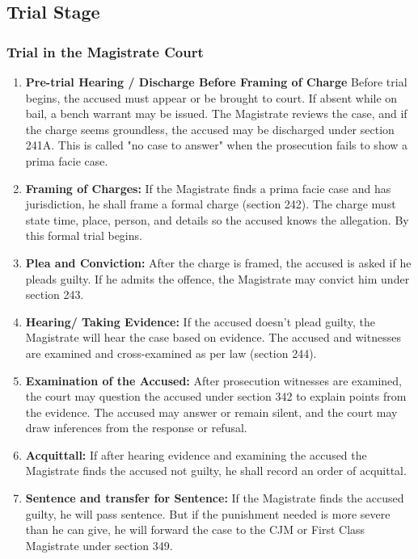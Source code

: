 \subsection{Trial Stage}
\subsubsection{Trial in the Magistrate Court}

\begin{enumerate}[label=$({\roman*})$, itemsep=1em]
   \item \textbf{Pre-trial Hearing / Discharge Before Framing of Charge}
   Before trial begins, the accused must appear or be brought to court. If absent while on bail, a bench warrant may be issued. The Magistrate reviews the case, and if the charge seems groundless, the accused may be discharged under section 241A. This is called "no case to answer" when the prosecution fails to show a prima facie case.
   
   \item \textbf{Framing of Charges:}
   If the Magistrate finds a prima facie case and has jurisdiction, he shall frame a formal charge (section 242). The charge must state time, place, person, and details so the accused knows the allegation. By this formal trial begins.
   
   \item \textbf{Plea and Conviction:}
   After the charge is framed, the accused is asked if he pleads guilty. If he admits the offence, the Magistrate may convict him under section 243.
   
   \item \textbf{Hearing/ Taking Evidence:}
   If the accused doesn't plead guilty, the Magistrate will hear the case based on evidence. The accused and witnesses are examined and cross-examined as per law (section 244).
   
   \item \textbf{Examination of the Accused:}
   After prosecution witnesses are examined, the court may question the accused under section 342 to explain points from the evidence. The accused may answer or remain silent, and the court may draw inferences from the response or refusal.
   
   \item \textbf{Acquittall:}
   If after hearing evidence and examining the accused the Magistrate finds the accused not guilty, he shall record an order of acquittal.
   
   \item \textbf{Sentence and transfer for Sentence:}
   If the Magistrate finds the accused guilty, he will pass sentence. But if the punishment needed is more severe than he can give, he will forward the case to the CJM or First Class Magistrate under section 349.
\end{enumerate}

